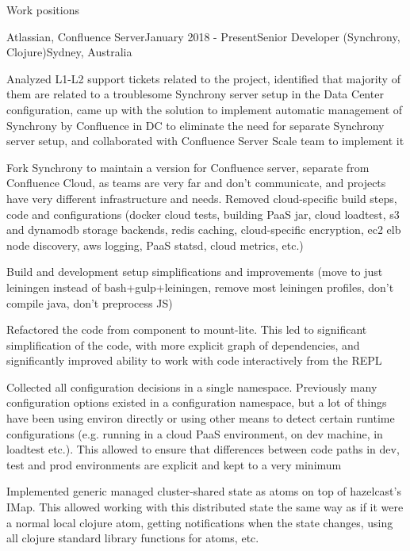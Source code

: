 \documentclass{resume} %
\begin{document}
\begin{rSection}{Work positions}

\begin{rSubsection}{Atlassian, Confluence Server}{January 2018 - Present}{Senior Developer (Synchrony, Clojure)}{Sydney, Australia}
\item Analyzed L1-L2 support tickets related to the project, identified that majority of them are related to a troublesome Synchrony server setup in the Data Center configuration, came up with the solution to implement automatic management of Synchrony by Confluence in DC to eliminate the need for separate Synchrony server setup, and collaborated with Confluence Server Scale team to implement it
\item Fork Synchrony to maintain a version for Confluence server, separate from Confluence Cloud, as teams are very far and don't communicate, and projects have very different infrastructure and needs. Removed cloud-specific build steps, code and configurations (docker cloud tests, building PaaS jar, cloud loadtest, s3 and dynamodb storage backends, redis caching, cloud-specific encryption, ec2 elb node discovery, aws logging, PaaS statsd, cloud metrics, etc.)
\item Build and development setup simplifications and improvements (move to just leiningen instead of bash+gulp+leiningen, remove most leiningen profiles, don't compile java, don't preprocess JS)
\item Refactored the code from component to mount-lite. This led to significant simplification of the code, with more explicit graph of dependencies, and significantly improved ability to work with code interactively from the REPL
\item Collected all configuration decisions in a single namespace. Previously many configuration options existed in a configuration namespace, but a lot of things have been using environ directly or using other means to detect certain runtime configurations (e.g. running in a cloud PaaS environment, on dev machine, in loadtest etc.). This allowed to ensure that differences between code paths in dev, test and prod environments are explicit and kept to a very minimum
\item Implemented generic managed cluster-shared state as atoms on top of hazelcast's IMap. This allowed working with this distributed state the same way as if it were a normal local clojure atom, getting notifications when the state changes, using all clojure standard library functions for atoms, etc.

\end{rSubsection}
\end{rSection}
\end{document}
